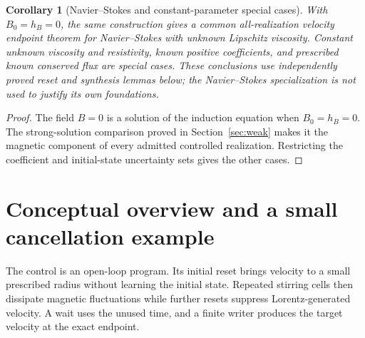 \documentclass[11pt,a4paper]{amsart}
\newtheorem{corollary}[theorem]{Corollary}
\theoremstyle{definition}
\theoremstyle{remark}
\numberwithin{equation}{section}
\begin{document}
\begin{corollary}[Navier--Stokes and constant-parameter special cases]\label{cor:NS}
With $B_0=h_B=0$, the same construction gives a common all-realization velocity endpoint theorem for Navier--Stokes with unknown Lipschitz viscosity. Constant unknown viscosity and resistivity, known positive coefficients, and prescribed known conserved flux are special cases. These conclusions use independently proved reset and synthesis lemmas below; the Navier--Stokes specialization is not used to justify its own foundations.
\end{corollary}
\begin{proof}
The field $B=0$ is a solution of the induction equation when $B_0=h_B=0$. The strong-solution comparison proved in Section~\ref{sec:weak} makes it the magnetic component of every admitted controlled realization. Restricting the coefficient and initial-state uncertainty sets gives the other cases.
\end{proof}



\section{Conceptual overview and a small cancellation example}\label{sec:overview}
The control is an open-loop program. Its initial reset brings velocity to a small prescribed radius without learning the initial state. Repeated stirring cells then dissipate magnetic fluctuations while further resets suppress Lorentz-generated velocity. A wait uses the unused time, and a finite writer produces the target velocity at the exact endpoint.

\begin{center}
\end{center}
\end{document}
